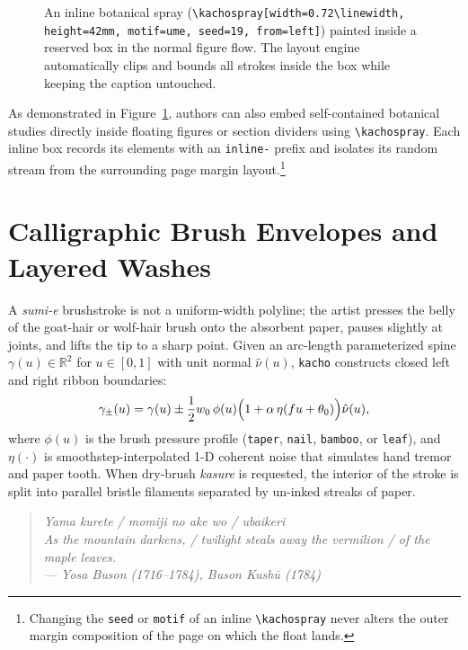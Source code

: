 \documentclass[11pt,a4paper,twoside]{article}
\begin{document}
\begin{figure}[t]
\centering
\kachospray[width=0.72\linewidth, height=42mm, motif=ume, seed=19, from=left]
\caption{An inline botanical spray (\texttt{\textbackslash kachospray[width=0.72\textbackslash linewidth, height=42mm, motif=ume, seed=19, from=left]}) painted inside a reserved box in the normal figure flow. The layout engine automatically clips and bounds all strokes inside the box while keeping the caption untouched.}
\label{fig:inline-spray}
\end{figure}

As demonstrated in Figure~\ref{fig:inline-spray}, authors can also embed self-contained botanical studies directly inside floating figures or section dividers using \texttt{\textbackslash kachospray}. Each inline box records its elements with an \texttt{inline-} prefix and isolates its random stream from the surrounding page margin layout.\footnote{Changing the \texttt{seed} or \texttt{motif} of an inline \texttt{\textbackslash kachospray} never alters the outer margin composition of the page on which the float lands.}

\clearpage
{}

\section{Calligraphic Brush Envelopes and Layered Washes}

A \emph{sumi-e} brushstroke is not a uniform-width polyline; the artist presses the belly of the goat-hair or wolf-hair brush onto the absorbent paper, pauses slightly at joints, and lifts the tip to a sharp point. Given an arc-length parameterized spine $\gamma(u) \in \mathbb{R}^2$ for $u \in [0,1]$ with unit normal $\hat{\nu}(u)$, \texttt{kacho} constructs closed left and right ribbon boundaries:
\begin{equation}
  \gamma_{\pm}(u) = \gamma(u) \pm \frac{1}{2} w_0 \, \phi(u) \Bigl(1 + \alpha \, \eta(f u + \theta_0)\Bigr) \hat{\nu}(u),
  \label{eq:ribbon}
\end{equation}
where $\phi(u)$ is the brush pressure profile (\texttt{taper}, \texttt{nail}, \texttt{bamboo}, or \texttt{leaf}), and $\eta(\cdot)$ is smoothstep-interpolated 1-D coherent noise that simulates hand tremor and paper tooth. When dry-brush \emph{kasure} is requested, the interior of the stroke is split into parallel bristle filaments separated by un-inked streaks of paper.

\begin{quote}
\itshape
Yama kurete / momiji no ake wo / ubaikeri\\[2pt]
As the mountain darkens, / twilight steals away the vermilion / of the maple leaves.\\[2pt]
\upshape\small --- Yosa Buson (1716--1784), \emph{Buson Kush\=u} (1784)
\end{quote}
\end{document}
